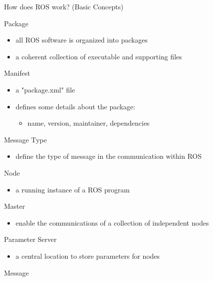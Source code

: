 \documentclass[10pt]{beamer}
\begin{document}
 \begin{frame}[allowframebreaks]{How does ROS work? (Basic Concepts)}
  \begin{block}{Package}
   \begin{itemize}
    \item all ROS software is organized into packages
    \item a coherent collection of executable and supporting files
   \end{itemize}   
  \end{block}
  \begin{block}{Manifest}
   \begin{itemize}
    \item a "package.xml" file
    \item defines some details about the package:
    \begin{itemize}
     \item name, version, maintainer, dependencies
    \end{itemize}
   \end{itemize}
  \end{block}
  \begin{block}{Message Type}
     \begin{itemize}
      \item define the type of message in the communication within ROS
     \end{itemize}
    \end{block}
 \begin{block}{Node}
  \begin{itemize}
   \item a running instance of a ROS program
  \end{itemize}
 \end{block}
 \begin{block}{Master}
  \begin{itemize}
   \item enable the communications of a collection of independent nodes
  \end{itemize}
 \end{block}
 \begin{block}{Parameter Server}
  \begin{itemize}
   \item a central location to store parameters for nodes
  \end{itemize}
 \end{block}
 \framebreak
 \begin{block}{Message}
  \begin{itemize}

\end{itemize}
\end{block}
\end{frame}
\end{document}
